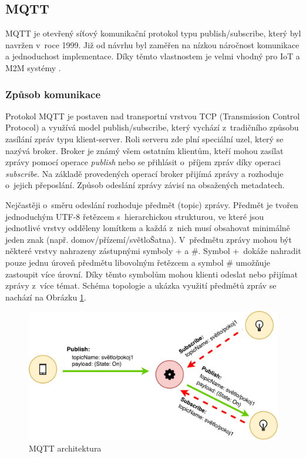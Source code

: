 \subsection{MQTT}
  MQTT je otevřený síťový komunikační protokol typu publish/subscribe, který byl navržen
  v~roce 1999. Již od návrhu byl zaměřen na nízkou náročnost komunikace a jednoduchost
  implementace. Díky těmto vlastnostem je velmi vhodný pro IoT a M2M systémy \cite{mqtt}.
  \subsubsection{Způsob komunikace}
  
  Protokol MQTT je postaven nad transportní vrstvou TCP (Transmission Control Protocol)
  a využívá model publish/subscribe, který vychází z~tradičního způsobu zasílání zpráv
  typu klient-server. Roli serveru zde plní speciální uzel, který se nazývá broker.
  Broker je známý všem ostatním klientům, kteří mohou zasílat zprávy pomocí operace
  \textit{publish} nebo se přihlásit o~příjem zpráv díky operaci \textit{subscribe}.
  Na základě provedených operací broker přijímá zprávy a rozhoduje o~jejich přeposlání.
  Způsob odeslání zprávy závisí na obsažených metadatech.
  
  Nejčastěji o~směru odeslání rozhoduje předmět (topic) zprávy. Předmět je tvořen
  jednoduchým UTF-8 řetězcem s~hierarchickou strukturou, ve které jsou jednotlivé
  vrstvy odděleny lomítkem a každá z~nich musí obsahovat minimálně jeden
  znak (např. domov/přízemí/světloŠatna). V~předmětu
  zprávy mohou být některé vrstvy nahrazeny zástupnými symboly + a \#. Symbol +~dokáže
  nahradit pouze jednu úroveň předmětu libovolným řetězcem a symbol \# umožňuje
  zastoupit více úrovní. Díky těmto symbolům mohou klienti odeslat nebo přijímat
  zprávy z~více témat. Schéma topologie a ukázka využití předmětů zpráv se nachází na 
  Obrázku \ref{obr.mqtt-arch}.
  
  \begin{figure}[ht]
\begin{center}
\includegraphics[scale=0.41]{pictures/mqtt-arch}
\caption{MQTT architektura}
\label{obr.mqtt-arch}
\end{center}
\end{figure}
  
